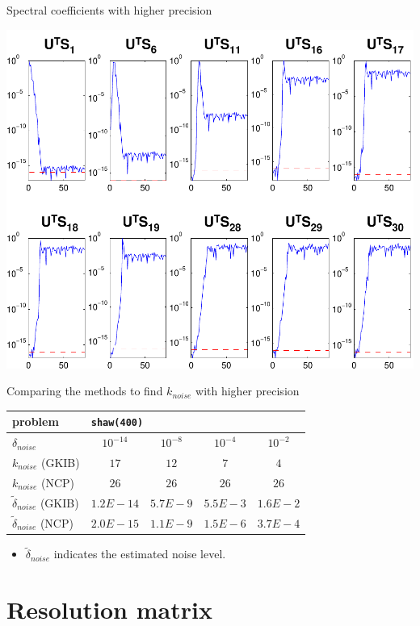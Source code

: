 \documentclass{beamer}
\begin{document}
\begin{frame}{Spectral coefficients with higher precision}
  \begin{center}
    \includegraphics[width=0.55\linewidth]{figures_shawvpa/run1/spec_sk}
  \end{center}
\end{frame}


\begin{frame}{Comparing the methods to find $k_{noise}$ with higher precision}
  \begin{center}
    \begin{tabular}{l||c|c|c|c}
      \multicolumn{1}{l||}{problem} & \multicolumn{4}{l}{\texttt{shaw(400)}} \\
      \hline \hline 
      $\delta_{noise}$ & $10^{-14}$ & $10^{-8}$ & $10^{-4}$ & $10^{-2}$ \\
      \hline
      $k_{noise}$ (GKIB) & $17$ & $12$ & $7$ & $4$ \\
      \hline
      $k_{noise}$ (NCP) & $26$ & $26$ & $26$ & $26$ \\
      \hline
      $\tilde{\delta}_{noise}$ (GKIB) & $1.2E-14$ & $5.7E-9$ & $5.5E-3$ &
      $1.6E-2$ \\
      \hline
      $\tilde{\delta}_{noise}$ (NCP) & $2.0E-15$ & $1.1E-9$ & $1.5E-6$ & 
      $3.7E-4$ \\
    \end{tabular}
  \end{center}
  \begin{itemize}
    \item $\tilde{\delta}_{noise}$ indicates the estimated noise level.
    \end{itemize}
\end{frame}



\section{Resolution matrix}
\end{document}
